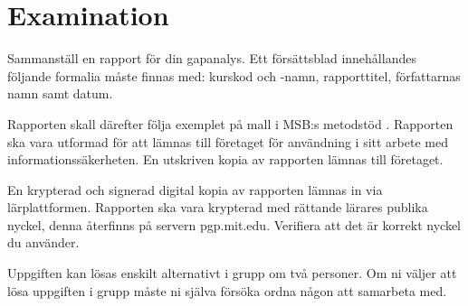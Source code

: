 \documentclass[a4paper]{article}
\begin{document}
\section{Examination}

Sammanställ en rapport för din gapanalys.
Ett försättsblad innehållandes följande formalia måste finnas med:
kurskod och -namn, rapporttitel, författarnas namn samt datum.

Rapporten skall därefter följa exemplet på mall i MSB:s metodstöd \citep[bilaga 
C]{MSB2011gap}.
Rapporten ska vara utformad för att lämnas till företaget för användning i sitt
arbete med informationssäkerheten.
En utskriven kopia av rapporten lämnas till företaget.

En krypterad och signerad digital kopia av rapporten lämnas in via 
lärplattformen.
Rapporten ska vara krypterad med rättande lärares publika nyckel, denna 
återfinns på servern pgp.mit.edu.
Verifiera att det är korrekt nyckel du använder.


Uppgiften kan lösas enskilt alternativt i grupp om två personer.
Om ni väljer att lösa uppgiften i grupp måste ni själva försöka ordna någon
att samarbeta med.


\printbibliography{}
\end{document}
